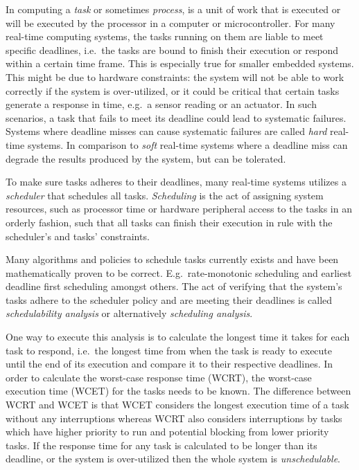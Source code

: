 In computing a \emph{task} or sometimes \emph{process}, is a unit of work that
is executed or will be executed by the processor in a computer or
microcontroller.  For many real-time computing systems, the tasks running on
them are liable to meet specific deadlines, i.e.\ the tasks are bound to finish
their execution or respond within a certain time frame. This is especially true
for smaller embedded systems. This might be due to hardware constraints: the
system will not be able to work correctly if the system is over-utilized, or it
could be critical that certain tasks generate a response in time, e.g.\ a
sensor reading or an actuator. In such scenarios, a task that fails to meet its
deadline could lead to systematic failures. Systems where deadline misses can
cause systematic failures are called \emph{hard} real-time systems. In
comparison to \emph{soft} real-time systems where a deadline miss can degrade
the results produced by the system, but can be tolerated.

To make sure tasks adheres to their deadlines, many real-time systems utilizes
a \emph{scheduler} that schedules all tasks. \emph{Scheduling} is the act of
assigning system resources, such as processor time or hardware peripheral
access to the tasks in an orderly fashion, such that all tasks can finish their
execution in rule with the scheduler's and tasks' constraints.

Many algorithms and policies to schedule tasks currently exists and have been
mathematically proven to be correct.  E.g.\ rate-monotonic
scheduling\cite{ratemonotonic} and earliest deadline first scheduling\cite{edf}
amongst others.  The act of verifying that the system's tasks adhere to the
scheduler policy and are meeting their deadlines is called \emph{schedulability
analysis} or alternatively \emph{scheduling analysis}.

One way to execute this analysis is to calculate the longest time it takes for
each task to respond, i.e.\ the longest time from when the task is ready to
execute until the end of its execution and compare it to their respective
deadlines.  In order to calculate the worst-case response time (WCRT), the
worst-case execution time (WCET) for the tasks needs to be known. The
difference between WCRT and WCET is that WCET considers the longest execution
time of a task without any interruptions whereas WCRT also considers
interruptions by tasks which have higher priority to
run and potential blocking from lower priority
tasks\cite{hardrealtimecomputingsystems}. If the response time for any task is
calculated to be longer than its deadline, or the system is over-utilized then
the whole system is \emph{unschedulable}.

